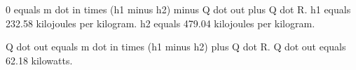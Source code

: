 0 equals m dot in times (h1 minus h2) minus Q dot out plus Q dot R.  
h1 equals 232.58 kilojoules per kilogram.  
h2 equals 479.04 kilojoules per kilogram.  

Q dot out equals m dot in times (h1 minus h2) plus Q dot R.  
Q dot out equals 62.18 kilowatts.